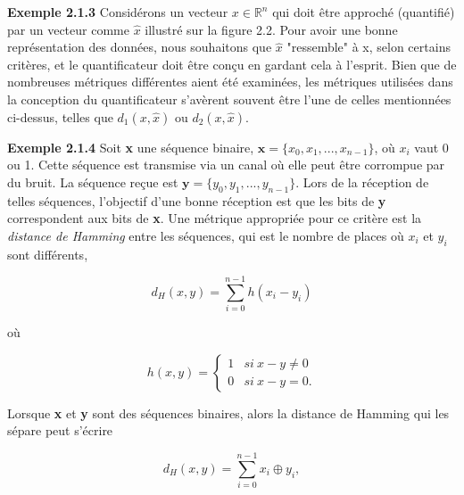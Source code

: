\documentclass[10pt,twoside,a4paper]{book}
\begin{document}
\vspace{4mm}
\noindent
\textbf{Exemple 2.1.3} Considérons un vecteur $x \in \mathbb{R}^n$ qui doit être approché (quantifié) par un vecteur comme $\hat{x}$ illustré sur la figure 2.2. 
Pour avoir une bonne représentation des données, nous souhaitons que $\hat{x}$ "ressemble" à x, selon certains critères, et le quantificateur doit être conçu en gardant cela à l'esprit. 
Bien que de nombreuses métriques différentes aient été examinées, les métriques utilisées dans la conception du quantificateur s'avèrent souvent être l'une de celles mentionnées 
ci-dessus, telles que $d_1(x, \hat{x})$ ou $d_2(x, \hat{x})$.


\vspace{4mm}
\noindent
\textbf{Exemple 2.1.4} Soit \textbf{x} une séquence binaire, $\textbf{x} = \{x_0, x_1,...,x_{n-1}\}$, où $x_i$ vaut 0 ou 1. Cette séquence est transmise via un canal où elle peut être 
corrompue par du bruit. La séquence reçue est $\textbf{y} = \{y_0, y_1,...,y_{n-1}\}$. Lors de la réception de telles séquences, l'objectif d'une bonne réception est que les bits de \textbf{y}
correspondent aux bits de \textbf{x}. Une métrique appropriée pour ce critère est la \textit{distance de Hamming} entre les séquences, qui est le nombre de places où $x_i$ et $y_i$ sont différents,

\begin{equation*}
  d_H(x, y) = \sum_{i=0}^{n-1} h(x_i - y_i)
\end{equation*}

\noindent
où

\begin{equation*}
  h(x, y) = \begin{cases} 1 & si \ x - y \neq 0 \\
    0 & si \ x - y = 0.
        \end{cases}
\end{equation*}

\noindent
Lorsque \textbf{x} et \textbf{y} sont des séquences binaires, alors la distance de Hamming qui les sépare peut s'écrire

\begin{equation*}
  d_H(x, y) = \sum_{i=0}^{n-1} x_i \oplus y_i ,
\end{equation*}
\end{document}
